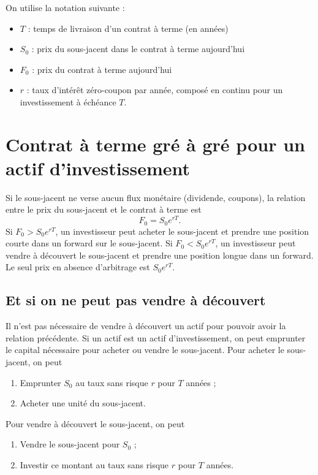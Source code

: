 On utilise la notation suivante : 

\begin{itemize}
	\item $T$ : temps de livraison d'un contrat à terme (en années)
	\item $S_0$ : prix du sous-jacent dans le contrat à terme aujourd'hui
	\item $F_0$ : prix du contrat à terme aujourd'hui
	\item $r$ : taux d'intérêt zéro-coupon par année, composé en continu pour un investissement à échéance $T$. 
\end{itemize}

\section{Contrat à terme gré à gré pour un actif d'investissement}

Si le sous-jacent ne verse aucun flux monétaire (dividende, coupons), la relation entre le prix du sous-jacent et le contrat à terme est 
$$F_0 = S_0 e^{rT}.$$
Si $F_0 > S_0 e^{rT}$, un investisseur peut acheter le sous-jacent et prendre une position courte dans un forward sur le sous-jacent. Si $F_0 < S_0 e^{rT}$, un investisseur peut vendre à découvert le sous-jacent et prendre une position longue dans un forward. Le seul prix en absence d'arbitrage est $S_0 e^{rT}$.

\subsection{Et si on ne peut pas vendre à découvert}

Il n'est pas nécessaire de vendre à découvert un actif pour pouvoir avoir la relation précédente. Si un actif est un actif d'investissement, on peut emprunter le capital nécessaire pour acheter ou vendre le sous-jacent. Pour acheter le sous-jacent, on peut
\begin{enumerate}
	\item Emprunter $S_0$ au taux sans risque $r$ pour $T$ années ;
	\item Acheter une unité du sous-jacent.
\end{enumerate}
Pour vendre à découvert le sous-jacent, on peut
\begin{enumerate}
	\item Vendre le sous-jacent pour $S_0$ ;
	\item Investir ce montant au taux sans risque $r$ pour $T$ années. 
\end{enumerate}

